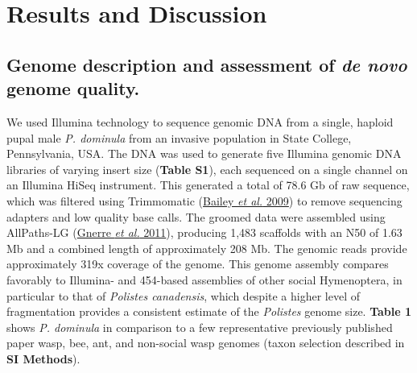 \section{Results and Discussion}

\subsection{Genome description and assessment of \textit{de novo} genome
quality.} We used Illumina technology to sequence genomic DNA from a
single, haploid pupal male \textit{P. dominula} from an invasive
population in State College, Pennsylvania, USA. The DNA was used to
generate five Illumina genomic DNA libraries of varying insert size
(\textbf{Table S1}), each sequenced on a single channel on an Illumina
HiSeq instrument. This generated a total of 78.6 Gb of raw sequence,
which was filtered using Trimmomatic
(\protect\hyperlink{ux5fENREFux5f1}{Bailey \textit{et al.} 2009}) to
remove sequencing adapters and low quality base calls. The groomed data
were assembled using AllPaths-LG
(\protect\hyperlink{ux5fENREFux5f14}{Gnerre \textit{et al.} 2011}),
producing 1,483 scaffolds with an N50 of 1.63 Mb and a combined length
of approximately 208 Mb. The genomic reads provide approximately 319x
coverage of the genome. This genome assembly compares favorably to
Illumina- and 454-based assemblies of other social Hymenoptera, in
particular to that of \textit{Polistes canadensis}, which despite a higher
level of fragmentation provides a consistent estimate of the
\textit{Polistes} genome size. \textbf{Table 1} shows \textit{P. dominula}
in comparison to a few representative previously published paper wasp,
bee, ant, and non-social wasp genomes (taxon selection described in
\textbf{SI Methods}).

